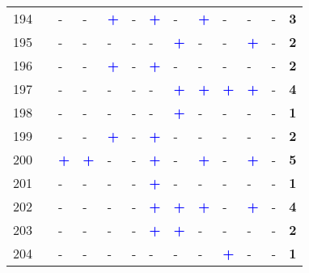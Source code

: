 \begin{longtable}{p{0.5cm}p{4.6cm}p{0.3cm}p{0.3cm}p{0.3cm}p{0.3cm}p{0.3cm}p{0.3cm}p{0.3cm}p{0.3cm}p{0.3cm}p{0.3cm}p{1cm}}
    \small{194} & \small{\textcite{ton_understanding_2020}}\index{Ton, Danique|pagebf} & - & - & \textcolor{blue}{\textbf{+}} & - & \textcolor{blue}{\textbf{+}} & - & \textcolor{blue}{\textbf{+}} & - & - & - & \textbf{3}\\
    \small{195} & \small{\textcite{tyndall_complementarity_2022}} & - & - & - & - & - & \textcolor{blue}{\textbf{+}} & - & - & \textcolor{blue}{\textbf{+}} & - & \textbf{2}\\
    \small{196} & \small{\textcite{tzouras_describing_2023}}\index{Tzouras, Panagiotis|pagebf} & - & - & \textcolor{blue}{\textbf{+}} & - & \textcolor{blue}{\textbf{+}} & - & - & - & - & - & \textbf{2}\\
    \small{197} & \small{\textcite{van_der_nat_bicycle_2018}}\index{van der Nat, Johanna Debóra|pagebf} & - & - & - & - & - & \textcolor{blue}{\textbf{+}} & \textcolor{blue}{\textbf{+}} & \textcolor{blue}{\textbf{+}} & \textcolor{blue}{\textbf{+}} & - & \textbf{4}\\
    \small{198} & \small{\textcite{waerden_relation_2018}}\index{Waerden, Peter|pagebf} & - & - & - & - & - & \textcolor{blue}{\textbf{+}} & - & - & - & - & \textbf{1}\\
    \small{199} & \small{\textcite{kampen_understanding_2020}}\index{van Kampen, Jullian|pagebf} & - & - & \textcolor{blue}{\textbf{+}} & - & \textcolor{blue}{\textbf{+}} & - & - & - & - & - & \textbf{2}\\
    \small{200} & \small{\textcite{kampen_bicycle_2021}}\index{van Kampen, Jullian|pagebf} & \textcolor{blue}{\textbf{+}} & \textcolor{blue}{\textbf{+}} & - & - & \textcolor{blue}{\textbf{+}} & - & \textcolor{blue}{\textbf{+}} & - & \textcolor{blue}{\textbf{+}} & - & \textbf{5}\\
    \small{201} & \small{\textcite{kampen_understanding_2021}}\index{van Kampen, Jullian|pagebf} & - & - & - & - & \textcolor{blue}{\textbf{+}} & - & - & - & - & - & \textbf{1}\\
    \small{202} & \small{\textcite{kuijk_preferences_2022}}\index{van Kuijk, R.J.|pagebf} & - & - & - & - & \textcolor{blue}{\textbf{+}} & \textcolor{blue}{\textbf{+}} & \textcolor{blue}{\textbf{+}} & - & \textcolor{blue}{\textbf{+}} & - & \textbf{4}\\
    \small{203} & \small{\textcite{van_mil_insights_2020}}\index{van Mil, Joeri F.P.|pagebf} & - & - & - & - & \textcolor{blue}{\textbf{+}} & \textcolor{blue}{\textbf{+}} & - & - & - & - & \textbf{2}\\
    \small{204} & \small{\textcite{vinagre_diaz_blind_2023}}\index{Vinagre Díaz, Juan José|pagebf} & - & - & - & - & - & - & - & \textcolor{blue}{\textbf{+}} & - & - & \textbf{1}\\

\end{longtable}
